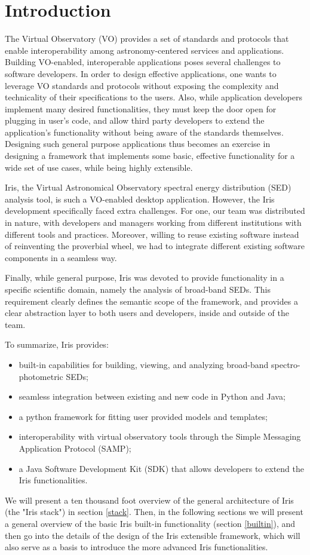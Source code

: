 \section{Introduction} 
The Virtual Observatory (VO) provides a set of standards and protocols that enable interoperability among astronomy-centered services and applications. Building VO-enabled, interoperable applications poses several challenges to software developers. In order to design effective applications, one wants to leverage VO standards and protocols without exposing the complexity and technicality of their specifications to the users. Also, while application developers implement many desired functionalities, they must keep the door open for plugging in user's code, and allow third party developers to extend the application's functionality without being aware of the standards themselves. Designing such general purpose applications thus becomes an exercise in designing a framework that implements some basic, effective functionality for a wide set of use cases, while being highly extensible.

Iris, the Virtual Astronomical Observatory spectral energy distribution (SED) analysis tool, is such a VO-enabled desktop application. However, the Iris development specifically faced extra challenges. For one, our team was distributed in nature, with developers and managers working from different institutions with different tools and practices. Moreover, willing to reuse existing software instead of reinventing the proverbial wheel, we had to integrate different existing software components in a seamless way.


Finally, while general purpose, Iris was devoted to provide functionality in a specific scientific domain, namely the analysis of broad-band SEDs. This requirement clearly defines the semantic scope of the framework, and provides a clear abstraction layer to both users and developers, inside and outside of the team.

To summarize, Iris provides:
\begin{itemize}
\item built-in capabilities for building, viewing, and analyzing broad-band spectro-photometric SEDs;
\item seamless integration between existing and new code in Python and Java;
\item a python framework for fitting user provided models and templates;
\item interoperability with virtual observatory tools through the Simple Messaging Application Protocol (SAMP);
\item a Java Software Development Kit (SDK) that allows developers to extend the Iris functionalities.
\end{itemize}

We will present a ten thousand foot overview of the general architecture of Iris (the "Iris stack") in section \ref{stack}. Then, in the following sections we will present a general overview of the basic Iris built-in functionality (section \ref{builtin}), and then go into the details of the design of the Iris extensible framework, which will also serve as a basis to introduce the more advanced Iris functionalities.